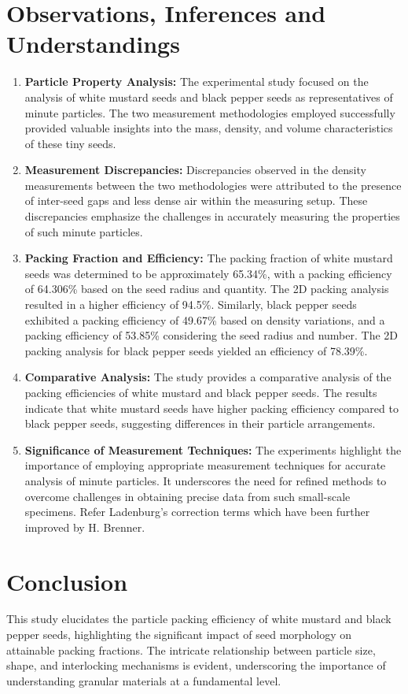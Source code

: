 \documentclass[twocolumn,11pt]{article}
\begin{document}
\section{Observations, Inferences and Understandings}

\begin{enumerate}
    \item \textbf{Particle Property Analysis:} The experimental study focused on the analysis of white mustard seeds and black pepper seeds as representatives of minute particles. The two measurement methodologies employed successfully provided valuable insights into the mass, density, and volume characteristics of these tiny seeds.
    
    \item \textbf{Measurement Discrepancies:} Discrepancies observed in the density measurements between the two methodologies were attributed to the presence of inter-seed gaps and less dense air within the measuring setup. These discrepancies emphasize the challenges in accurately measuring the properties of such minute particles.
    
    \item \textbf{Packing Fraction and Efficiency:} The packing fraction of white mustard seeds was determined to be approximately 65.34\%, with a packing efficiency of 64.306\% based on the seed radius and quantity. The 2D packing analysis resulted in a higher efficiency of 94.5\%. Similarly, black pepper seeds exhibited a packing efficiency of 49.67\% based on density variations, and a packing efficiency of 53.85\% considering the seed radius and number. The 2D packing analysis for black pepper seeds yielded an efficiency of 78.39\%.
    
    \item \textbf{Comparative Analysis:} The study provides a comparative analysis of the packing efficiencies of white mustard and black pepper seeds. The results indicate that white mustard seeds have higher packing efficiency compared to black pepper seeds, suggesting differences in their particle arrangements.
    
    \item \textbf{Significance of Measurement Techniques:} The experiments highlight the importance of employing appropriate measurement techniques for accurate analysis of minute particles. It underscores the need for refined methods to overcome challenges in obtaining precise data from such small-scale specimens. Refer Ladenburg\cite{H_Brenner}'s correction terms which have been further improved by H. Brenner.
    
\end{enumerate}
\section{Conclusion}
This study elucidates the particle packing efficiency of white mustard and black pepper seeds, highlighting the significant impact of seed morphology on attainable packing fractions. The intricate relationship between particle size, shape, and interlocking mechanisms is evident, underscoring the importance of understanding granular materials at a fundamental level.



\end{document}
